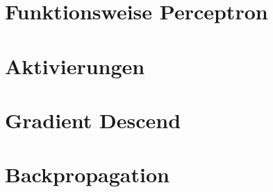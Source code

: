 \documentclass[../main.tex]{subfiles}
\begin{document}
\section{Funktionsweise Perceptron}
\section{Aktivierungen}
\section{Gradient Descend}
\section{Backpropagation}
\end{document}
